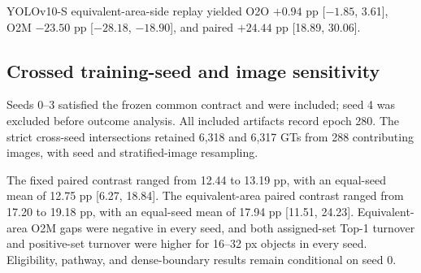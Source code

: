 \documentclass[preprint,10pt]{elsarticle}
\begin{document}
YOLOv10-S equivalent-area-side replay yielded O2O $+0.94$ pp [$-1.85$, 3.61], O2M $-23.50$ pp [$-28.18$, $-18.90$], and paired $+24.44$ pp [18.89, 30.06].

\subsection{Crossed training-seed and image sensitivity}

Seeds 0--3 satisfied the frozen common contract and were included; seed 4 was excluded before outcome analysis. All included artifacts record epoch 280. The strict cross-seed intersections retained 6,318 and 6,317 GTs from 288 contributing images, with seed and stratified-image resampling.

\begin{table}[ht]
\centering
\caption{Fixed-one-pixel scale contrasts across four protocol-eligible training seeds on the strict cross-seed common-valid support. The equal-seed mean interval uses 20,000 crossed seed and stratified image-cluster bootstrap replicates. With four top-level seeds, the interval remains a sensitivity analysis rather than precise detector-training-level uncertainty.}

\end{table}

\begin{table}[ht]
\centering
\caption{Equivalent-area-side endpoint contrasts across the same four seeds on the strict cross-seed common-valid support. The equal-seed mean interval uses 20,000 crossed seed and stratified image-cluster bootstrap replicates.}
\resizebox{\textwidth}{!}{}
\end{table}

\begin{table}[ht]
\centering
\caption{Equivalent-area-side Rank--Set and native positive-count contrasts across the same four seeds. Each seed contributes 25,165 legal directions from the 6,317-GT strict endpoint intersection. Intervals use the crossed seed and stratified image-cluster bootstrap.}
\resizebox{\textwidth}{!}{}
\end{table}

The fixed paired contrast ranged from 12.44 to 13.19 pp, with an equal-seed mean of 12.75 pp [6.27, 18.84]. The equivalent-area paired contrast ranged from 17.20 to 19.18 pp, with an equal-seed mean of 17.94 pp [11.51, 24.23]. Equivalent-area O2M gaps were negative in every seed, and both assigned-set Top-1 turnover and positive-set turnover were higher for 16--32 px objects in every seed. Eligibility, pathway, and dense-boundary results remain conditional on seed 0.
\end{document}

